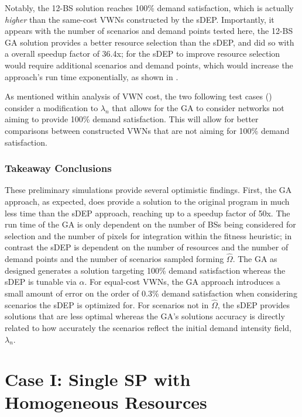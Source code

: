 \documentclass[12pt,dvipsnames]{report}
\begin{document}
Notably, the 12-BS solution reaches 100\% demand satisfaction, which is actually \emph{higher} than the same-cost VWNs constructed by the sDEP.  Importantly, it appears with the number of scenarios and demand points tested here, the 12-BS GA solution provides a better resource selection than the sDEP, and did so with a overall speedup factor of 36.4x; for the sDEP to improve resource selection would require additional scenarios and demand points, which would increase the approach's run time exponentially, as shown in .

As mentioned within analysis of VWN cost, the two following test cases () consider a modification to $\lambda_n$ that allows for the GA to consider networks not aiming to provide 100\% demand satisfaction.  This will allow for better comparisons between constructed VWNs that are not aiming for 100\% demand satisfaction.

\subsubsection{Takeaway Conclusions}

These preliminary simulations provide several optimistic findings.  First, the GA approach, as expected, does provide a solution to the original program in much less time than the sDEP approach, reaching up to a speedup factor of 50x.  The run time of the GA is only dependent on the number of BSs being considered for selection and the number of pixels for integration within the fitness heuristic; in contrast the sDEP is dependent on the number of resources and the number of demand points and the number of scenarios sampled forming $\hat{\Omega}$.  The GA as designed generates a solution targeting 100\% demand satisfaction whereas the sDEP is tunable via $\alpha$.  For equal-cost VWNs, the GA approach introduces a small amount of error on the order of 0.3\% demand satisfaction when considering scenarios the sDEP is optimized for.  For scenarios not in $\hat{\Omega}$, the sDEP provides solutions that are less optimal whereas the GA's solutions accuracy is directly related to how accurately the scenarios reflect the initial demand intensity field, $\lambda_n$.

\section{Case I: Single SP with Homogeneous Resources} \label{sec:caseI}
\end{document}
